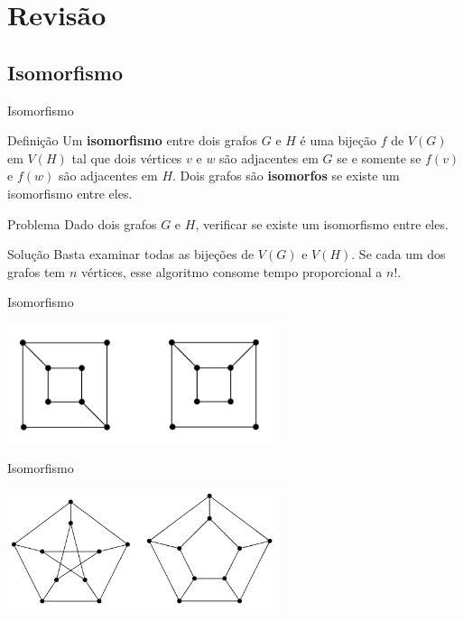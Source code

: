 \documentclass[xcolor=dvipsnames,table]{beamer}
\begin{document}
    \section{Revisão}
	
	
	\subsection{Isomorfismo}
	\begin{frame}{Isomorfismo}
		\begin{block}{Definição}
			Um {\bf isomorfismo} entre dois grafos $G$ e $H$ é uma bijeção $f$ de $V(G)$ em $V(H)$ tal que dois vértices $v$ e $w$ são adjacentes em $G$ se e somente se $f(v)$ e $f(w)$ são adjacentes em $H$. Dois grafos são {\bf isomorfos} se existe um isomorfismo entre eles.
		\end{block}
		\begin{block}{Problema}
			Dado dois grafos $G$ e $H$, verificar se existe um isomorfismo entre eles.
		\end{block}
		\begin{block}{Solução}
			Basta examinar todas as bijeções de $V(G)$ e $V(H)$. Se cada um dos grafos tem $n$ vértices, esse algoritmo consome tempo proporcional a $n!$.
		\end{block}
	\end{frame}
	
	\begin{frame}{Isomorfismo}
		\begin{center}
			\includegraphics[width=8cm]{images/isomorfismo01.png}
		\end{center}
	\end{frame}
	
	\begin{frame}{Isomorfismo}
		\begin{center}
			\includegraphics[width=8cm]{images/isomorfismo02.png}
		\end{center}
	\end{frame}
	
\end{document}
